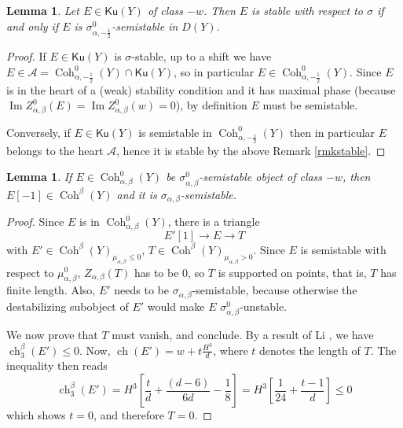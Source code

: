 \documentclass[11pt]{amsart}
\newtheorem{lemma}[thm]{Lemma}
\theoremstyle{definition}
\DeclareMathOperator{\Ch}{ch}
\DeclareMathOperator{\im}{Im}
\DeclareMathOperator{\Coh}{Coh}
\newcommand{\Ku}{\mathsf{Ku}}
\begin{document}

\begin{lemma}\label{connection}
Let $E\in \Ku(Y)$ of class $-w$. Then $E$ is stable with respect to $\sigma$ if and only if $E$ is $\sigma^0_{\alpha,-\frac{1}{2}}$-semistable in $D(Y)$. %
\end{lemma}
\begin{proof}
If $E \in \Ku(Y)$ is $\sigma$-stable, up to a shift we have $E \in \mathcal{A} = \Coh^0_{\alpha,-\frac{1}{2}}(Y) \cap \Ku(Y)$, so in particular $E\in \Coh^0_{\alpha,-\frac{1}{2}}(Y)$. Since $E$ is in the heart of a (weak) stability condition and it has maximal phase (because $\im Z^0_{\alpha,\beta}(E)=\im Z^0_{\alpha,\beta}(w)=0$), by definition $E$ must be semistable.

Conversely, if $E\in \Ku(Y)$ is semistable in $\Coh^0_{\alpha,-\frac{1}{2}}(Y)$ then in particular $E$ belongs to the heart $\mathcal{A}$, hence it is stable by the above Remark \ref{rmkstable}.
\end{proof}


\begin{lemma}\label{prop_semistable_objects2}
If $E\in \Coh^0_{\alpha,\beta}(Y)$ be $\sigma^0_{\alpha,\beta}$-semistable object of class $-w$, then $E[-1]\in \Coh^\beta(Y)$ and it is $\sigma_{\alpha,\beta}$-semistable.
\end{lemma}
\begin{proof}
Since $E$ is in $\Coh^0_{\alpha,\beta}(Y)$, there is a triangle
$$E'[1]\to E\to T$$
with $E'\in \Coh^\beta(Y)_{\mu_{\alpha,\beta}\leq 0}$, $T\in \Coh^\beta(Y)_{\mu_{\alpha,\beta}> 0}$. Since $E$ is semistable with respect to $\mu^0_{\alpha,\beta}$, $Z_{\alpha,\beta}(T)$ has to be $0$, so $T$ is supported on points, that is, $T$ has finite length. 
Also, $E'$ needs to be $\sigma_{\alpha,\beta}$-semistable, because otherwise the destabilizing subobject of $E'$ would make $E$ $\sigma_{\alpha,\beta}^0$-unstable.

We now prove that $T$ must vanish, and conclude.
By a result of Li \cite{Li15}, we have $\Ch^\beta_3(E')\leq 0$. Now, $\Ch(E')=w + t\frac{H^3}{d}$, where $t$ denotes the length of $T$. 
The inequality then reads
\[ \Ch^\beta_3(E')=H^3\left[ \frac{t}{d} + \frac{(d-6)}{6d} -\frac18\right]=H^3\left[ \frac{1}{24} + \frac{t-1}{d} \right]\leq 0 \]
which shows $t=0$, and therefore $T=0$.
\end{proof}
\end{document}
